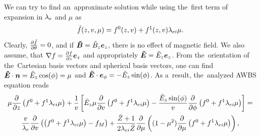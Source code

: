 \documentclass[preprint,12pt]{elsarticle}
\newcounter{bla}
\begin{document}
We can try to find an~approximate solution while using the~first term of
expansion in $\lambda_e$ and $\mu$ as
\begin{equation}
  \tilde{f}(z, v, \mu) = f^0(z, v) + f^1(z, v) \lambda_{ei}\mu .
  \label{eq:f_approximation}
\end{equation}
Clearly, $\frac{\partial{\tilde{f}}}{\partial{\theta}} = 0$, and if $\boldsymbol{\tilde{B}} = \tilde{B}_z\boldsymbol{e}_z$, 
there is no effect of magnetic field. We also assume, that 
$\nabla f = \frac{\partial{f}}{\partial{z}}\boldsymbol{e}_z$ and appropriately 
$\boldsymbol{\tilde{E}} = \tilde{E}_z\boldsymbol{e}_z$.
From the~orientation of the~Cartesian basis vectors and spherical 
basis vectors, one can find $\boldsymbol{\tilde{E}}\cdot\boldsymbol{n} = \tilde{E}_z \cos(\phi) = \mu$ and
$\boldsymbol{\tilde{E}}\cdot\boldsymbol{e}_\phi = -\tilde{E}_z\sin(\phi)$. As a~result, the~analyzed
AWBS equation reads
\begin{multline}
  \mu\frac{\partial{}}{\partial{z}}\left( f^0 + f^1 \lambda_{ei}\mu \right) 
  + \frac{1}{v} \left[ \tilde{E}_z\mu \frac{\partial{}}{\partial{v}} 
  \left( f^0 + f^1 \lambda_{ei}\mu \right) 
  - \frac{\tilde{E}_z\sin(\phi)}{v}\frac{\partial{}}{\partial{\phi}} 
  \left( f^0 + f^1 \lambda_{ei}\mu \right)
  \right] 
  =\\
  \frac{v}{\lambda_e}\frac{\partial{}}{\partial{v}}
  \left(\left( f^0 + f^1 \lambda_{ei}\mu \right) -f_M\right)
  + \frac{\bar{Z} +1}{2 \lambda_{ei} \bar{Z}}\frac{\partial{}}{\partial{\mu}}\left((1 - \mu^2)
  \frac{\partial{}}{\partial{\mu}}\left( f^0 + f^1 \lambda_{ei}\mu \right) \right) ,
  \label{eq:AWBS_spherical}
\end{multline}
\end{document}
